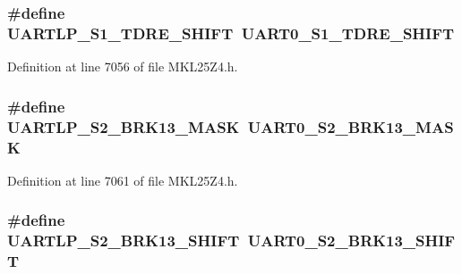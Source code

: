 \subsubsection[{\texorpdfstring{U\+A\+R\+T\+L\+P\+\_\+\+S1\+\_\+\+T\+D\+R\+E\+\_\+\+S\+H\+I\+FT}{UARTLP_S1_TDRE_SHIFT}}]{\setlength{\rightskip}{0pt plus 5cm}\#define U\+A\+R\+T\+L\+P\+\_\+\+S1\+\_\+\+T\+D\+R\+E\+\_\+\+S\+H\+I\+FT~{\bf U\+A\+R\+T0\+\_\+\+S1\+\_\+\+T\+D\+R\+E\+\_\+\+S\+H\+I\+FT}}\hypertarget{group___backward___compatibility___symbols_gad1469491e7fcddf3521ef7d5ac86dc04}{}\label{group___backward___compatibility___symbols_gad1469491e7fcddf3521ef7d5ac86dc04}


Definition at line 7056 of file M\+K\+L25\+Z4.\+h.

\subsubsection[{\texorpdfstring{U\+A\+R\+T\+L\+P\+\_\+\+S2\+\_\+\+B\+R\+K13\+\_\+\+M\+A\+SK}{UARTLP_S2_BRK13_MASK}}]{\setlength{\rightskip}{0pt plus 5cm}\#define U\+A\+R\+T\+L\+P\+\_\+\+S2\+\_\+\+B\+R\+K13\+\_\+\+M\+A\+SK~{\bf U\+A\+R\+T0\+\_\+\+S2\+\_\+\+B\+R\+K13\+\_\+\+M\+A\+SK}}\hypertarget{group___backward___compatibility___symbols_ga4ae8233f1781ea7dc494fc5eff1262df}{}\label{group___backward___compatibility___symbols_ga4ae8233f1781ea7dc494fc5eff1262df}


Definition at line 7061 of file M\+K\+L25\+Z4.\+h.

\subsubsection[{\texorpdfstring{U\+A\+R\+T\+L\+P\+\_\+\+S2\+\_\+\+B\+R\+K13\+\_\+\+S\+H\+I\+FT}{UARTLP_S2_BRK13_SHIFT}}]{\setlength{\rightskip}{0pt plus 5cm}\#define U\+A\+R\+T\+L\+P\+\_\+\+S2\+\_\+\+B\+R\+K13\+\_\+\+S\+H\+I\+FT~{\bf U\+A\+R\+T0\+\_\+\+S2\+\_\+\+B\+R\+K13\+\_\+\+S\+H\+I\+FT}}\hypertarget{group___backward___compatibility___symbols_ga43368a6f820ea82d1ee803cf7e94c5b1}{}\label{group___backward___compatibility___symbols_ga43368a6f820ea82d1ee803cf7e94c5b1}


